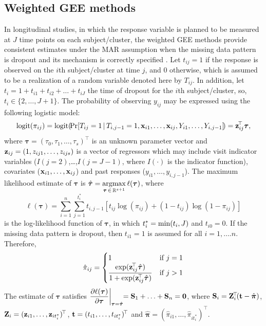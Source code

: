 \subsection{Weighted GEE methods}\label{WE}
In longitudinal studies, in which the response variable is planned to be measured at $J$ time points on each subject/cluster, the weighted GEE methods provide consistent estimates under the MAR assumption when the missing data pattern is dropout and its mechanism is correctly specified \citep{RRZ95}. Let $t_{ij}=1$ if the response is observed on the $i$th subject/cluster at time $j$, and $0$ otherwise, which is assumed to be a realization of a random variable denoted here by $T_{ij}$. In addition, let $t_i=1+t_{i1}+t_{i2}+\ldots+t_{iJ}$ the time of dropout for the $i$th subject/cluster, so, $t_i\in\{2,\ldots,J+1\}$. The probability of observing $y_{ij}$ may be expressed using the following logistic model: 
$${\rm logit}(\pi_{ij})={\rm logit}\!\left(\!{\rm Pr}\!\left[T_{ij}=1\,|\,T_{i,j-1}=1,{\bf x}_{i1},\ldots,{\bf x}_{ij},Y_{i1},\ldots,Y_{i,j-1}\right]\!\right)={\bf z}_{ij}^{\!\top}\bm{\tau},$$
where $\bm{\tau}=(\tau_0,\tau_1,\ldots,\tau_s)^{\!\top}$ is an unknown parameter vector and ${\bf z}_{ij}=(1,z_{ij1},\ldots,z_{ijs})$ is a vector of regressors 
which may include visit indicator variables ($I(j=2)$,\ldots,$I(j=J-1)$, where $I(\cdot)$ is the indicator function), covariates (${\bf x}_{i1},\ldots,{\bf x}_{ij}$) and past responses ($y_{i1},\ldots,y_{i,j-1}$). The maximum
likelihood estimate of $\bm{\tau}$ is $\hat{\bm{\tau}}=\argmax\limits_{\bm{\tau}\,\in\,\mathbb{R}^{s+1}} \ell(\bm{\tau})$, where \citep{RRZ95,PLR02}
$$\ell(\bm{\tau})=\sum\limits_{i=1}^n\sum\limits_{j=1}^{t_i^*} t_{i,j-1}\!\left[t_{ij}\log(\pi_{ij}) + (1-t_{ij})\log(1-\pi_{ij})\right]$$
is the log-likelihood function of $\bm{\tau}$, in which $t_i^*={\rm min}(t_i,J)$ and $t_{i0}=0$. If the missing data pattern is dropout, then $t_{i1}=1$ is assumed for all $i=1,\ldots.n$. Therefore, 
$$\hat{\pi}_{ij}=
\begin{cases}
1 &\text{if } j=1\\
\dfrac{\exp({\bf z}_{ij}^{\!\top}\hat{\bm{\tau}})}{1+\exp({\bf z}_{ij}^{\!\top}\hat{\bm{\tau}})} &\text{if } j>1
\end{cases}
$$
The estimate of $\bm{\tau}$ satisfies $\dfrac{\partial \ell({\bm{\tau}})}{\partial {\bm{\tau}}}\bigg\rvert_{\bm{\tau}=\hat{\bm{\tau}}}\!\!={\bf S}_1+\ldots+{\bf S}_n={\bf 0}$, where ${\bf S}_i={\bf Z}_i^{\!\top}\!({\bf t}-\hat{\bm{\pi}})$, ${\bf Z}_i=({\bf z}_{i1},\ldots,{\bf z}_{it_i^*})^{\!\top}$, ${\bf t}=(t_{i1},\ldots,t_{it_i^*})^{\!\top}$ and $\hat{\bm{\pi}}=(\hat{\pi}_{i1},\ldots,\hat{\pi}_{it_i^*})^{\!\top}$.

